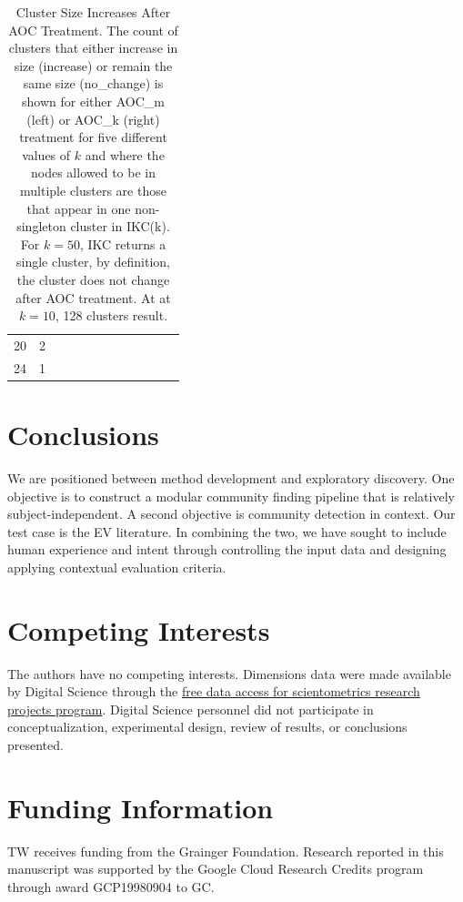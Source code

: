 \documentclass[12pt, oneside]{article}   	%
\begin{document}
\begin{table}
{\begin{tabular}{clllllllllll}
20 &   2 &  &  &  &  &  &  &  &  &  \\ 
24 &   1 &  &  &  &  &  &  &  &  &  \\ 
   \hline
\end{tabular}}
\caption{Cluster Size Increases After AOC Treatment. The count of clusters that either increase in size (increase) or remain the same size (no\_change) is shown for either AOC\_m (left) or AOC\_k (right) treatment for five different values of $k$ and where the nodes allowed to be in multiple clusters are those that appear in one non-singleton cluster in IKC(k). For $k=50$, IKC returns a single cluster, by definition, the cluster does not change after AOC treatment. At at $k=10$, 128 clusters result.}
\label{tab:tab3}
\end{table}

\clearpage

\section{Conclusions} We are positioned between method development and exploratory discovery. One objective is to construct a modular community finding pipeline that is relatively subject-independent. A second objective is community detection in context. Our test case is the EV literature. In combining the two, we have sought to include human experience and intent \citep{vonluxburg2012clustering} through controlling the input data and designing applying contextual evaluation criteria.

\section*{Competing Interests} \vspace{3mm} The authors have no competing interests. Dimensions data were made available by Digital Science through the \href{http://www.dimensions.ai/scientometric-research/.}{free data access for scientometrics research projects program}. Digital Science personnel did not participate in conceptualization, experimental design, review of results, or conclusions presented. 

\section*{Funding Information} TW receives funding from the Grainger Foundation. Research reported in this manuscript was supported by the Google Cloud Research Credits program through award GCP19980904 to GC.
\end{document}

